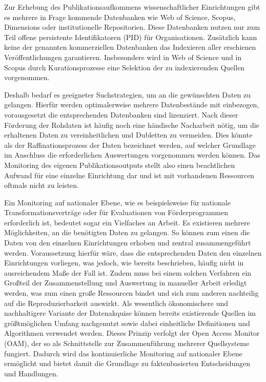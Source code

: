 \documentclass[a4paper,
fontsize=11pt,
oneside,
numbers=noperiodatend,
parskip=half-,
bibliography=totoc,
final
]{scrartcl}
\begin{document}
Zur Erhebung des Publikationsaufkommens wissenschaftlicher Einrichtungen
gibt es mehrere in Frage kommende Datenbanken wie Web of Science,
Scopus, Dimensions oder institutionelle Repositorien. Diese Datenbanken
nutzen nur zum Teil offene persistente Identifikatoren (PID) für
Organisationen. Zusätzlich kann keine der genannten kommerziellen
Datenbanken das Indexieren aller erschienen Veröffentlichungen
garantieren. Insbesondere wird in Web of Science und in Scopus durch
Kurationsprozesse eine Selektion der zu indexierenden Quellen
vorgenommen.

Deshalb bedarf es geeigneter Suchstrategien, um an die gewünschten Daten
zu gelangen. Hierfür werden optimalerweise mehrere Datenbestände mit
einbezogen, vorausgesetzt die entsprechenden Datenbanken sind
lizenziert. Nach dieser Förderung der Rohdaten ist häufig noch eine
händische Nacharbeit nötig, um die erhaltenen Daten zu vereinheitlichen
und Dubletten zu vermeiden. Dies könnte als der Raffinationsprozess der
Daten bezeichnet werden, auf welcher Grundlage im Anschluss die
erforderlichen Auswertungen vorgenommen werden können. Das Monitoring
des eigenen Publikationsoutputs stellt also einen beachtlichen Aufwand
für eine einzelne Einrichtung dar und ist mit vorhandenen Ressourcen
oftmals nicht zu leisten.

Ein Monitoring auf nationaler Ebene, wie es beispielsweise für nationale
Transformationsverträge oder für Evaluationen von Förderprogrammen
erforderlich ist, bedeutet sogar ein Vielfaches an Arbeit. Es existieren
mehrere Möglichkeiten, an die benötigten Daten zu gelangen. So können
zum einen die Daten von den einzelnen Einrichtungen erhoben und zentral
zusammengeführt werden. Voraussetzung hierfür wäre, dass die
entsprechenden Daten den einzelnen Einrichtungen vorliegen, was jedoch,
wie bereits beschrieben, häufig nicht in ausreichendem Maße der Fall
ist. Zudem muss bei einem solchen Verfahren ein Großteil der
Zusammenstellung und Auswertung in manueller Arbeit erledigt werden, was
zum einen große Ressourcen bindet und sich zum anderen nachteilig auf
die Reproduzierbarkeit auswirkt. Als wesentlich ökonomischere und
nachhaltigere Variante der Datenakquise können bereits existierende
Quellen im größtmöglichen Umfang nachgenutzt sowie dabei einheitliche
Definitionen und Algorithmen verwendet werden. Dieses Prinzip verfolgt
der Open Access Monitor (OAM), der so als Schnittstelle zur
Zusammenführung mehrerer Quellsysteme fungiert. Dadurch wird das
kontinuierliche Monitoring auf nationaler Ebene ermöglicht und bietet
damit die Grundlage zu faktenbasierten Entscheidungen und Handlungen.
\end{document}
